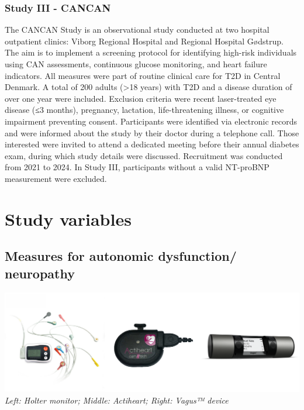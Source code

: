 \documentclass[
  letterpaper,
  headsepline=true,
  open=any]{scrbook}
\begin{document}
\hypertarget{study-iii---cancan}{%
\subsubsection{Study III - CANCAN}\label{study-iii---cancan}}

The CANCAN Study is an observational study conducted at two hospital
outpatient clinics: Viborg Regional Hospital and Regional Hospital
Gødstrup. The aim is to implement a screening protocol for identifying
high-risk individuals using CAN assessments, continuous glucose
monitoring, and heart failure indicators. All measures were part of
routine clinical care for T2D in Central Denmark. A total of 200 adults
(\textgreater18 years) with T2D and a disease duration of over one year
were included. Exclusion criteria were recent laser-treated eye disease
(≤3 months), pregnancy, lactation, life-threatening illness, or
cognitive impairment preventing consent. Participants were identified
via electronic records and were informed about the study by their doctor
during a telephone call. Those interested were invited to attend a
dedicated meeting before their annual diabetes exam, during which study
details were discussed. Recruitment was conducted from 2021 to 2024. In
Study III, participants without a valid NT-proBNP measurement were
excluded.

\hypertarget{study-variables}{%
\section{Study variables}\label{study-variables}}

\hypertarget{measures-for-autonomic-dysfunction-neuropathy}{%
\subsection{Measures for autonomic dysfunction/
neuropathy}\label{measures-for-autonomic-dysfunction-neuropathy}}

\includegraphics{images/can_tools.pdf} \emph{Left: Holter monitor;
Middle: Actiheart; Right: Vagus™ device}
\end{document}
